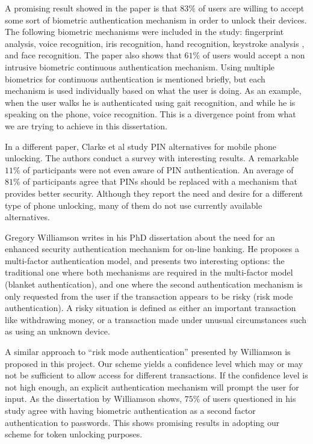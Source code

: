 A promising result showed in the paper is that $83\%$ of users are willing to accept some sort of biometric authentication mechanism in order to unlock their devices. The following biometric mechanisms were included in the study: fingerprint analysis, voice recognition, iris recognition, hand recognition, keystroke analysis \cite{clarke2003using}, and face recognition. The paper also shows that $61\%$ of users would accept a non intrusive biometric continuous authentication mechanism. Using multiple biometrics for continuous authentication is mentioned briefly, but each mechanism is used individually based on what the user is doing. As an example, when the user walks he is authenticated using gait recognition, and while he is speaking on the phone, voice recognition. This is a divergence point from what we are trying to achieve in this dissertation.

In a different paper, Clarke et al \cite{clarke2002acceptance} study PIN alternatives for mobile phone unlocking. The authors conduct a survey with interesting results. A remarkable $11\%$ of participants were not even aware of PIN authentication. An average of $81\%$ of participants agree that PINs should be replaced with a mechanism that provides better security. Although they report the need and desire for a different type of phone unlocking, many of them do not use currently available alternatives.

Gregory Williamson \cite{williamson2006enhanced} writes in his PhD dissertation  about the need for an enhanced security authentication mechanism for on-line banking. He proposes a multi-factor authentication model, and presents two interesting options: the traditional one where both mechanisms are required in the multi-factor model (blanket authentication), and one where the second authentication mechanism is only requested from the user if the transaction appears to be risky (risk mode authentication). A risky situation is defined as either an important transaction like withdrawing money, or a transaction made under unusual circumstances such as using an unknown device. 

A similar approach to ``risk mode authentication'' presented by Williamson \cite{williamson2006enhanced} is proposed in this project. Our scheme yields a confidence level which may or may not be sufficient to allow access for different transactions. If the confidence level is not high enough, an explicit authentication mechanism will prompt the user for input. As the dissertation by Williamson shows, $75\%$ of users questioned in his study agree with having biometric authentication as a second factor authentication to passwords. This shows promising results in adopting our scheme for token unlocking purposes.


